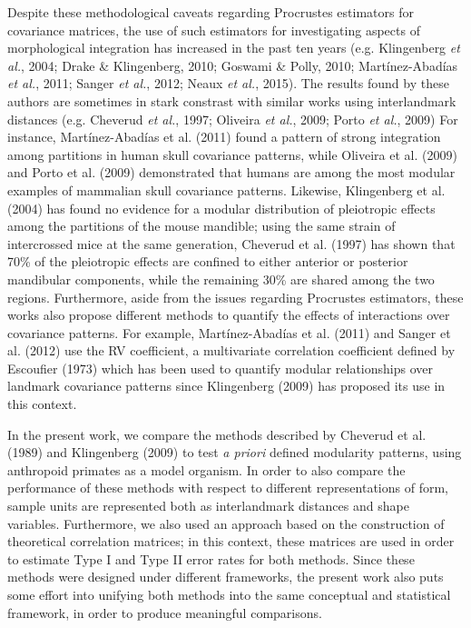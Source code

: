 \documentclass[11pt,twoside]{report}
\begin{document}
Despite these methodological caveats regarding Procrustes estimators for
covariance matrices, the use of such estimators for investigating
aspects of morphological integration has increased in the past ten years
(e.g. Klingenberg \emph{et al.}, 2004; Drake \& Klingenberg, 2010;
Goswami \& Polly, 2010; Martínez-Abadías \emph{et al.}, 2011; Sanger
\emph{et al.}, 2012; Neaux \emph{et al.}, 2015). The results found by
these authors are sometimes in stark constrast with similar works using
interlandmark distances (e.g. Cheverud \emph{et al.}, 1997; Oliveira
\emph{et al.}, 2009; Porto \emph{et al.}, 2009) For instance,
Martínez-Abadías et al. (2011) found a pattern of strong integration
among partitions in human skull covariance patterns, while Oliveira et
al. (2009) and Porto et al. (2009) demonstrated that humans are among
the most modular examples of mammalian skull covariance patterns.
Likewise, Klingenberg et al. (2004) has found no evidence for a modular
distribution of pleiotropic effects among the partitions of the mouse
mandible; using the same strain of intercrossed mice at the same
generation, Cheverud et al. (1997) has shown that 70\% of the
pleiotropic effects are confined to either anterior or posterior
mandibular components, while the remaining 30\% are shared among the two
regions. Furthermore, aside from the issues regarding Procrustes
estimators, these works also propose different methods to quantify the
effects of interactions over covariance patterns. For example,
Martínez-Abadías et al. (2011) and Sanger et al. (2012) use the RV
coefficient, a multivariate correlation coefficient defined by Escoufier
(1973) which has been used to quantify modular relationships over
landmark covariance patterns since Klingenberg (2009) has proposed its
use in this context.

In the present work, we compare the methods described by Cheverud et al.
(1989) and Klingenberg (2009) to test \emph{a priori} defined modularity
patterns, using anthropoid primates as a model organism. In order to
also compare the performance of these methods with respect to different
representations of form, sample units are represented both as
interlandmark distances and shape variables. Furthermore, we also used
an approach based on the construction of theoretical correlation
matrices; in this context, these matrices are used in order to estimate
Type I and Type II error rates for both methods. Since these methods
were designed under different frameworks, the present work also puts
some effort into unifying both methods into the same conceptual and
statistical framework, in order to produce meaningful comparisons.
\end{document}
